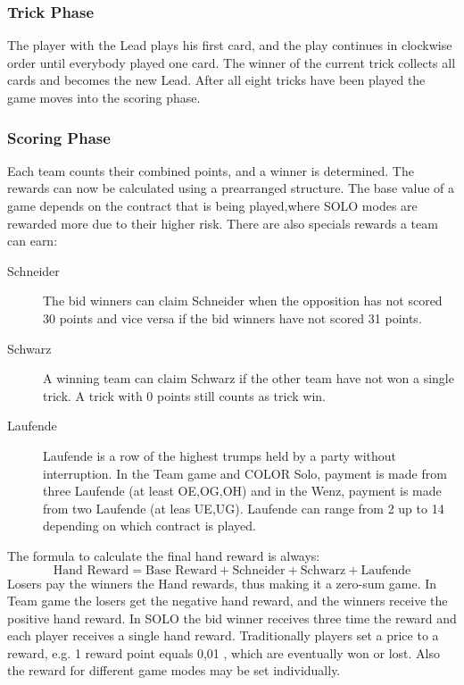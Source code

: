 \subsubsection{Trick Phase}
The player with the Lead plays his first card, and the play continues in clockwise order until everybody played one
card.
The winner of the current trick collects all cards and becomes the new Lead.
After all eight tricks have been played the game moves into the scoring phase.

\subsubsection{Scoring Phase}\label{scoringphase}
Each team counts their combined points, and a winner is determined.
The rewards can now be calculated using a prearranged structure.
The base value of a game depends on the contract
that is being played,where SOLO modes are rewarded more due to their higher risk.
\newline
There are also specials rewards a team can earn:
\begin{description}
    \item[Schneider] The bid winners can claim Schneider when the opposition has not scored 30 points and vice versa
    if the bid winners have not scored 31 points.
    \item[Schwarz] A winning team can claim Schwarz if the other team have not won a single trick.
    A trick with 0 points still counts as trick win.
    \item[Laufende] Laufende is a row of the highest trumps held by a party without interruption.
    In the Team game and COLOR Solo, payment is made from three Laufende (at least OE,OG,OH) and in the Wenz,
    payment is made from two Laufende (at leas UE,UG).
    Laufende can range from 2 up to 14 depending on which contract is played.
\end{description}
The formula to calculate the final hand reward is always:
\[\text{Hand Reward} = \text{Base Reward} + \text{Schneider} + \text{Schwarz} + \text{Laufende}\]
Losers pay the winners the Hand rewards, thus making it a zero-sum game.
In Team game the losers get the negative hand reward, and the winners receive the positive hand reward.
In SOLO the bid winner receives three time the reward and each player receives a single hand reward.
Traditionally players set a price to a reward, e.g. 1 reward point equals 0,01 \texteuro, which are eventually won or
lost.
Also the reward for different game modes may be set individually.
